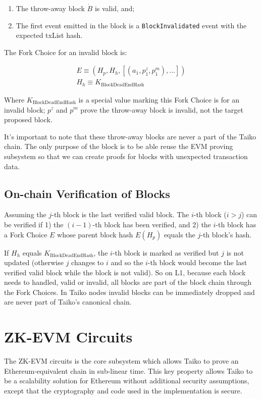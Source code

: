 \documentclass[9pt,oneside]{amsart}
\begin{document}
\begin{multicols}{2}
\begin{enumerate}
\item The throw-away block $\dot{B}$ is valid, and;
\item The first event emitted in the block is a \texttt{BlockInvalidated} event with the expected txList hash. 
\end{enumerate}

The Fork Choice for an invalid block is:

\begin{eqnarray}
E \equiv (H_p, H_h, [(a_1, p^{z}_1, p^{m}_1),...]) \\
H_h \equiv K_{\mathrm{BlockDeadEndHash}}
\end{eqnarray}

Where $K_{\mathrm{BlockDeadEndHash}}$ is a special value marking this Fork Choice is for an invalid block; $p^{z}$ and  $p^{m}$ prove the throw-away block is invalid, not the target proposed block.

It's important to note that these throw-away blocks are never a part of the Taiko chain. The only purpose of the block is to be able reuse the EVM proving subsystem so that we can create proofs for blocks with unexpected transaction data.

\subsection{On-chain Verification of Blocks}\label{sec:verifying}

Assuming the $j$-th block is the last verified valid block. The $i$-th block ($i > j$) can be verified if 1) the $(i-1)$-th block has been verified, and 2) the $i$-th block has a Fork Choice $E$ whose parent block hash $E(H_p)$ equals the $j$-th block's hash.

If $H_h$ equals $K_{\mathrm{BlockDeadEndHash}}$, the $i$-th block is marked as verified but $j$ is not updated (otherwise $j$ changes to $i$ and so the $i$-th block would become the last verified valid block while the block is not valid). So on L1, because each block needs to handled, valid or invalid, all blocks are part of the block chain through the Fork Choices. In Taiko nodes invalid blocks can be immediately dropped and are never part of Taiko's canonical chain.

\section{ZK-EVM Circuits}

The ZK-EVM circuits is the core subsystem which allows Taiko to prove an Ethereum-equivalent chain in sub-linear time. This key property allows Taiko to be a scalability solution for Ethereum without additional security assumptions, except that the cryptography and code used in the implementation is secure.


\end{multicols}
\end{document}
